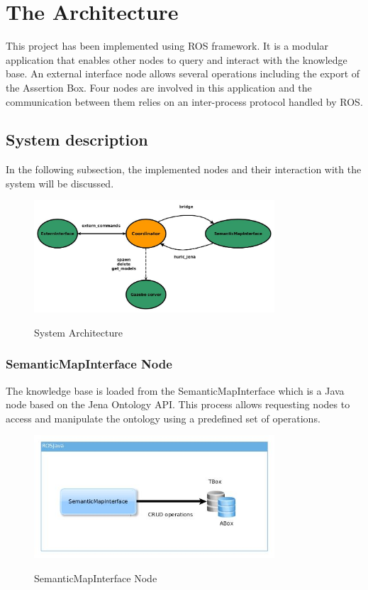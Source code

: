 \section{The Architecture}

This project has been implemented using ROS framework. It is a modular application that enables other nodes to query and interact with the knowledge base. An external interface node allows several operations including the export of the Assertion Box. Four nodes are involved in this application and the communication between them relies on an inter-process protocol handled by ROS.

\subsection{System description}
In the following subsection, the implemented nodes and their interaction with the system will be discussed. 

\begin{figure}[H]
\centering
\includegraphics[width=0.8\textwidth]{imgs/arch1.jpg}
\label{fig:actions}
\caption{System Architecture}
\end{figure}

\subsubsection{SemanticMapInterface Node}
The knowledge base is loaded from the SemanticMapInterface which is a Java node based on the Jena Ontology API. This process allows requesting nodes to access and manipulate the ontology using a predefined set of operations.

\begin{figure}[H]
\centering
\includegraphics[width=0.8\textwidth]{imgs/semantic.jpg}
\label{fig:actions}
\caption{SemanticMapInterface Node}
\end{figure}

